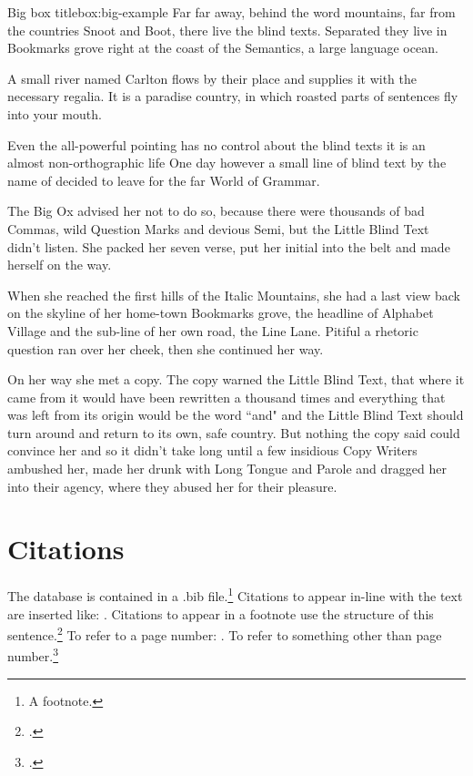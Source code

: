 \documentclass[embargoed]{grattan}
\begin{document}
\begin{bigbox*}{Big box title}{box:big-example}
Far far away, behind the word mountains, far from the countries Snoot and Boot, there live the blind texts.
Separated they live in Bookmarks grove right at the coast of the Semantics, a large language ocean.

A small river named Carlton flows by their place and supplies it with the necessary regalia.
It is a paradise country, in which roasted parts of sentences fly into your mouth.

Even the all-powerful pointing has no control about the blind texts it is an almost non-orthographic life One day however a small line of blind text by the name of  decided to leave for the far World of Grammar.

The Big Ox advised her not to do so, because there were thousands of bad Commas, wild Question Marks and devious Semi, but the Little Blind Text didn't listen.
She packed her seven verse, put her initial into the belt and made herself on the way.

When she reached the first hills of the Italic Mountains, she had a last view back on the skyline of her home-town Bookmarks grove, the headline of Alphabet Village and the sub-line of her own road, the Line Lane.
Pitiful a rhetoric question ran over her cheek, then she continued her way.

On her way she met a copy.
The copy warned the Little Blind Text, that where it came from it would have been rewritten a thousand times and everything that was left from its origin would be the word ``and" and the Little Blind Text should turn around and return to its own, safe country.
But nothing the copy said could convince her and so it didn't take long until a few insidious Copy Writers ambushed her, made her drunk with Long Tongue and Parole and dragged her into their agency, where they abused her for their pleasure.
\end{bigbox*}

\chapter{Citations}\label{chap:citations}
The database is contained in a .bib file.\footnote{A footnote.} 
Citations to appear in-line with the text are inserted like: \textcite{Daley-etal-2016-SAPTO}.
Citations to appear in a footnote use the structure of this sentence.\footcite{Daley-etal-2016-Assessing-2016-super-tax-reforms}
To refer to a page number: \textcite[][30]{Daley-etal-2016-SAPTO}.
To refer to something other than page number.\footcite[][Chapter~4]{Daley-etal-2016-SAPTO}
\end{document}
